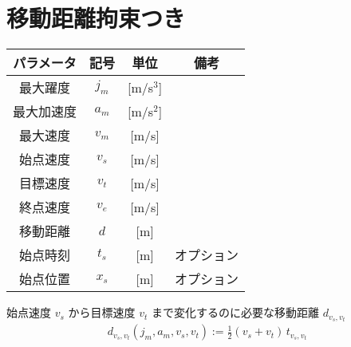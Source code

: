 \documentclass[a5paper]{ltjsarticle}
\begin{document}
\clearpage
\section{移動距離拘束つき}
\begin{table}[htbp]
    \centering
    \begin{tabular}{c|c|c|c}
        パラメータ & 記号  & 単位        & 備考       \\ \hline\hline
        最大躍度   & $j_m$ & [m/s${}^3$] &            \\
        最大加速度 & $a_m$ & [m/s${}^2$] &            \\
        最大速度   & $v_m$ & [m/s]       &            \\
        始点速度   & $v_s$ & [m/s]       &            \\
        目標速度   & $v_t$ & [m/s]       &            \\
        終点速度   & $v_e$ & [m/s]       &            \\
        移動距離   & $d$   & [m]         &            \\
        始点時刻   & $t_s$ & [m]         & オプション \\
        始点位置   & $x_s$ & [m]         & オプション \\
    \end{tabular}
\end{table}

始点速度 $v_s$ から目標速度 $v_t$ まで変化するのに必要な移動距離 $d_{v_s,v_t}$
\begin{align}
    d_{v_s,v_t}(j_m,a_m,v_s,v_t)
    := \frac{1}{2}(v_s+v_t) \, t_{v_s,v_t}
\end{align}
\end{document}

